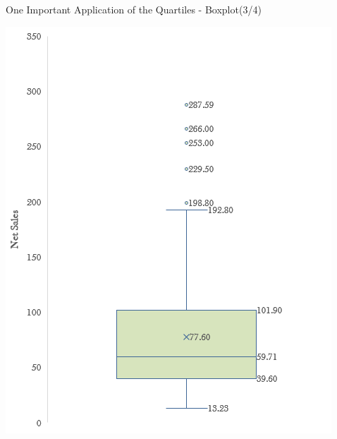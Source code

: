 \documentclass{beamer}
\begin{document}
\begin{frame}{One Important Application of the Quartiles - Boxplot(3/4)}

\begin{multicols}{2}

\begin{center}
\includegraphics[scale=0.5]{images/ch2BoxPlotSingle.png}
\end{center}



\end{multicols}
\end{frame}
\end{document}
